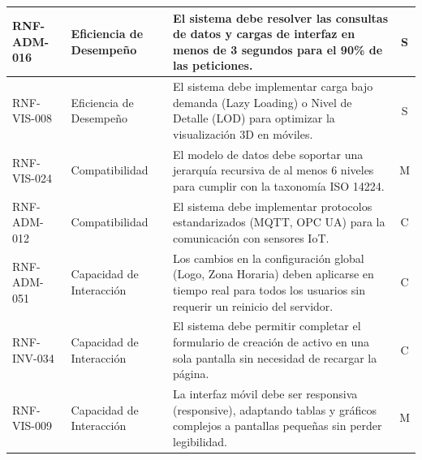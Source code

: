 \begin{longtable}{|p{2.5cm}|p{3.5cm}|p{7.5cm}|c|}
RNF-ADM-016 & Eficiencia de Desempeño & El sistema debe resolver las consultas de datos y cargas de interfaz en menos de 3 segundos para el 90\% de las peticiones. & S \\ \hline
RNF-VIS-008 & Eficiencia de Desempeño & El sistema debe implementar carga bajo demanda (Lazy Loading) o Nivel de Detalle (LOD) para optimizar la visualización 3D en móviles. & S \\ \hline
RNF-VIS-024 & Compatibilidad & El modelo de datos debe soportar una jerarquía recursiva de al menos 6 niveles para cumplir con la taxonomía ISO 14224. & M \\ \hline
RNF-ADM-012 & Compatibilidad & El sistema debe implementar protocolos estandarizados (MQTT, OPC UA) para la comunicación con sensores IoT. & C \\ \hline
RNF-ADM-051 & Capacidad de Interacción & Los cambios en la configuración global (Logo, Zona Horaria) deben aplicarse en tiempo real para todos los usuarios sin requerir un reinicio del servidor. & C \\ \hline
RNF-INV-034 & Capacidad de Interacción & El sistema debe permitir completar el formulario de creación de activo en una sola pantalla sin necesidad de recargar la página. & C \\ \hline
RNF-VIS-009 & Capacidad de Interacción & La interfaz móvil debe ser responsiva (responsive), adaptando tablas y gráficos complejos a pantallas pequeñas sin perder legibilidad. & M \\ \hline
\end{longtable}
\normalsize
